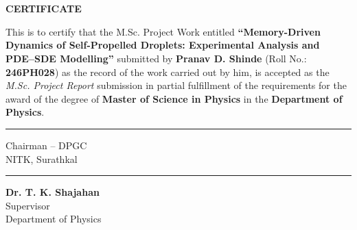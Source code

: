 \chapter*{}

\begin{center}
\vspace*{1.8cm}
{\Huge\bfseries CERTIFICATE}
\end{center}

\vspace{2cm}

This is to certify that the M.Sc. Project Work entitled
\textbf{``Memory-Driven Dynamics of Self-Propelled Droplets: Experimental Analysis and PDE--SDE Modelling''}
submitted by \textbf{Pranav D. Shinde}
(Roll No.: \textbf{246PH028}) as the record of the work carried out by him,
is accepted as the \textit{M.Sc. Project Report} submission in partial
fulfillment of the requirements for the award of the degree of
\textbf{Master of Science in Physics} in the
\textbf{Department of Physics}.

\vspace{4cm}

\noindent
\begin{minipage}[t]{0.4\textwidth}
\raggedright
\rule{5cm}{0.4pt}

Chairman -- DPGC\\
NITK, Surathkal
\end{minipage}
\hfill
\begin{minipage}[t]{0.4\textwidth}
\raggedleft
\rule{5cm}{0.4pt}

\textbf{Dr. T. K. Shajahan}\\
Supervisor\\
Department of Physics
\end{minipage}

